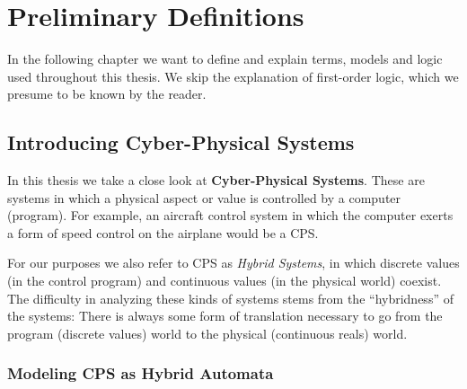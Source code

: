 

\chapter{Preliminary Definitions}
\label{ch:Preliminary}

In the following chapter we want to define and explain terms, models and logic used throughout this thesis. We skip the explanation of first-order logic, which we presume to be known by the reader.

\section{Introducing Cyber-Physical Systems}
\label{sec:pre:cps}

In this thesis we take a close look at \textbf{Cyber-Physical Systems}. These are systems in which a physical aspect or value is controlled by a computer (program). For example, an aircraft control system in which the computer exerts a form of speed control on the airplane would be a CPS. 

For our purposes we also refer to CPS as \textit{Hybrid Systems}, in which discrete values (in the control program) and continuous values (in the physical world) coexist. The difficulty in analyzing these kinds of systems stems from the ``hybridness'' of the systems: There is always some form of translation necessary to go from the program (discrete values) world to the physical (continuous reals) world. 

\subsection{Modeling CPS as Hybrid Automata}


